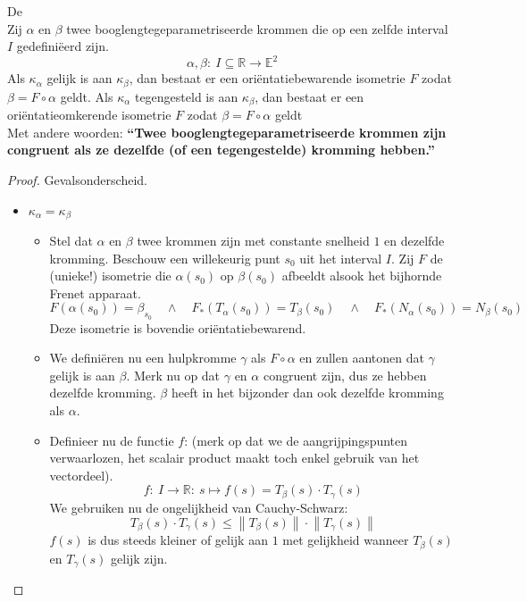 \documentclass[main.tex]{subfiles}
\begin{document}
\begin{st}
  \examen
  De \\
  Zij $\alpha$ en $\beta$ twee booglengtegeparametriseerde krommen die op een zelfde interval $I$ gedefini\"eerd zijn.
  \[ \alpha,\beta:\ I \subseteq \mathbb{R} \rightarrow \mathbb{E}^{2} \]
  Als $\kappa_{\alpha}$ gelijk is aan $\kappa_{\beta}$, dan bestaat er een ori\"entatiebewarende isometrie $F$ zodat $\beta = F \circ \alpha$ geldt.
  Als $\kappa_{\alpha}$ tegengesteld is aan $\kappa_{\beta}$, dan bestaat er een ori\"entatieomkerende isometrie $F$ zodat $\beta = F \circ \alpha$ geldt\\
  Met andere woorden:
  \textbf{``Twee booglengtegeparametriseerde krommen zijn congruent als ze dezelfde (of een tegengestelde) kromming hebben.''}

  \begin{proof}
    Gevalsonderscheid.
    \begin{itemize}
    \item $\kappa_{\alpha} = \kappa_{\beta}$\\
      \begin{itemize}
      \item 
      Stel dat $\alpha$ en $\beta$ twee krommen zijn met constante snelheid $1$ en dezelfde kromming.
      Beschouw een willekeurig punt $s_{0}$ uit het interval $I$.
      Zij $F$ de (unieke!) isometrie die $\alpha(s_{0})$ op $\beta(s_{0})$ afbeeldt alsook het bijhornde Frenet apparaat.
      \[ F(\alpha(s_{0})) = \beta_{s_{0}} \quad\wedge\quad
      F_{*}(T_{\alpha}(s_{0})) = T_{\beta}(s_{0}) \quad\wedge\quad
      F_{*}(N_{\alpha}(s_{0})) = N_{\beta}(s_{0}) \] Deze isometrie is
      bovendie ori\"entatiebewarend.
    \item We defini\"eren nu een hulpkromme $\gamma$ als $F \circ \alpha$ en zullen aantonen dat $\gamma$ gelijk is aan $\beta$.
      Merk nu op dat $\gamma$ en $\alpha$ congruent zijn, dus ze hebben dezelfde kromming.
      $\beta$ heeft in het bijzonder dan ook dezelfde kromming als $\alpha$.
    \item Definieer nu de functie $f$: (merk op dat we de aangrijpingspunten verwaarlozen, het scalair product maakt toch enkel gebruik van het vectordeel).
      \[ f:\ I \rightarrow \mathbb{R}:\ s \mapsto f(s) = T_{\beta}(s) \cdot T_{\gamma}(s) \]
      We gebruiken nu de ongelijkheid van Cauchy-Schwarz:
      \[ T_{\beta}(s) \cdot T_{\gamma}(s) \le \left\| T_{\beta}(s) \right\| \cdot \left\| T_{\gamma}(s) \right\|  \]
      $f(s)$ is dus steeds kleiner of gelijk aan $1$ met gelijkheid wanneer $T_{\beta}(s)$ en $T_{\gamma}(s)$ gelijk zijn.


\end{itemize}
\end{itemize}
\end{proof}
\end{st}
\end{document}
